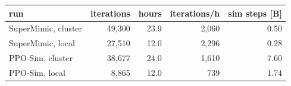 \begin{tabular}{lrrrr}\toprule
run & iterations & hours & iterations/h & sim steps [B] \\\midrule
SuperMimic, cluster & 49,300 & 23.9 & 2,060 & 0.50 \\
SuperMimic, local & 27,510 & 12.0 & 2,296 & 0.28 \\
PPO-Sim, cluster & 38,677 & 24.0 & 1,610 & 7.60 \\
PPO-Sim, local & 8,865 & 12.0 & 739 & 1.74 \\
\bottomrule\end{tabular}
